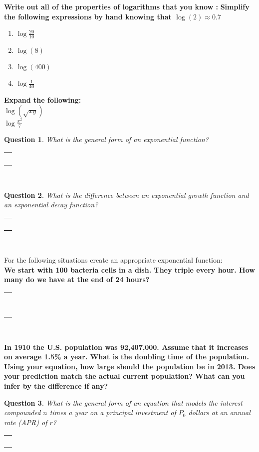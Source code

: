 \documentclass[11pt]{amsart}
\newcommand{\Bansbox}{
\begin{center}  
\begin{tabular}{|c|}        %
\hline
\hspace{4.5in} \\
\hspace{4.5in} \\
\hspace{4.5in} \\
\hspace{4.5in} \\
\hspace{4.5in} \\
\hspace{4.5in} \\
\hspace{4.5in} \\
\hspace{4.5in} \\
\hline
\end{tabular}\\
\end{center}}
\newcommand{\ansbox}{
\begin{center}  
\begin{tabular}{|c|}        %
\hline
\hspace{4.5in} \\
\hspace{4.5in} \\
\hspace{4.5in} \\
\hspace{4.5in} \\
\hline
\end{tabular}\\
\end{center}}
\newtheorem*{quest}{Question}
\begin{document}
{\bf Write out all of the properties of logarithms that you know : } \vspace{7cm} 
\newpage
{\bf Simplify the following expressions by hand knowing that $\log(2) \approx 0.7 $ } \\
\begin{enumerate}
\item $\log\frac{20}{10} $ \\
\item $\log (8) $\\
\item $\log(400) $\\
\item $ \log \frac{1}{40} $ \\
\end{enumerate}

{\bf Expand the following: } \\
$ \log( \sqrt{xy} ) $ \\
$ \log\frac{x^2}{7} $ \\

\begin{quest} What is the general form of an exponential function? \end{quest} 
\ansbox
\begin{quest} What is the difference between an exponential growth function and
an exponential decay function?  \end{quest}
\ansbox
\vspace{.5cm}

For the following situations create an appropriate exponential function: \\

{\bf  We start with 100 bacteria cells in a dish.  They triple every hour.    How many do we have at 
the end of 24 hours?   } 
\Bansbox
\vspace{.5cm}

{\bf In 1910 the U.S. population was 92,407,000.   Assume that it increases on average 1.5\% a year.  
What is the doubling time of the population.   Using your equation, how large should the population
be in 2013.   Does your prediction match the actual current population?   What can you infer by the difference
if any?   } \\
\vspace{7cm} 


\begin{quest} What is the general form of an equation that models the interest compounded $n$ times a year
on a principal investment of $P_0$ dollars at an annual rate (APR) of $r$?   \end{quest}
\ansbox
\vspace{.5cm}
\end{document}
